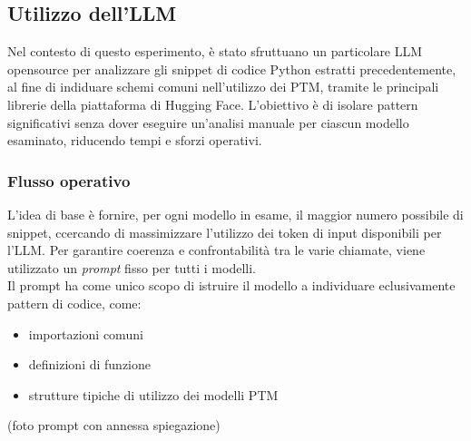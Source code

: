 \documentclass{article}
\begin{document}
\begin{itemize}
\subsection{Utilizzo dell'LLM}
Nel contesto di questo esperimento, è stato sfruttuano un particolare LLM opensource per analizzare gli snippet di codice Python estratti precedentemente, al fine di indiduare schemi comuni nell'utilizzo dei PTM, tramite le principali librerie della piattaforma di Hugging Face.
L'obiettivo è di isolare pattern significativi senza dover eseguire un'analisi manuale per ciascun modello esaminato, riducendo tempi e sforzi operativi.

\subsubsection{Flusso operativo}
L'idea di base è fornire, per ogni modello in esame, il maggior numero possibile di snippet, ccercando di massimizzare l’utilizzo dei token di input disponibili per l’LLM. Per garantire coerenza e confrontabilità tra le varie chiamate, viene utilizzato un \textit{prompt} fisso per tutti i modelli. \\
Il prompt ha come unico scopo di istruire il modello a individuare eclusivamente pattern di codice, come:
\begin{itemize}
    \item importazioni comuni
    \item definizioni di funzione
    \item strutture tipiche di utilizzo dei modelli PTM
\end{itemize}

(foto prompt con annessa spiegazione)


\end{itemize}
\end{document}
